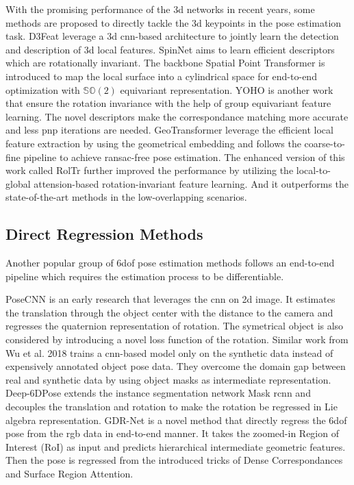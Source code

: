 \documentclass[12pt,DIV14,BCOR12mm,a4paper,footinclude=false,headinclude,parskip=half-,twoside,openright,cleardoublepage=empty,toc=index,bibliography=totoc,listof=totoc]{scrreprt}
\numberwithin{equation}{chapter}
\begin{document}
With the promising performance of the \gls{3d} networks \cite{qi2017pointnet,qi2017pointnet++} in recent years, some methods are proposed to directly tackle the \gls{3d} keypoints in the pose estimation task. D3Feat \cite{bai2020d3feat} leverage a \gls{3d} \gls{cnn}-based architecture to jointly learn the detection and description of \gls{3d} local features. SpinNet \cite{ao2021spinnet} aims to learn efficient descriptors which are rotationally invariant. The backbone Spatial Point Transformer is introduced to map the local surface into a cylindrical space for end-to-end optimization with $\mathbb{SO}(2)$ equivariant representation. YOHO \cite{wang2022hypothesize} is another work that ensure the rotation invariance with the help of group equivariant feature learning. The novel descriptors make the correspondance matching more accurate and less \gls{pnp} iterations are needed. GeoTransformer \cite{qin2022geometric} leverage the efficient local feature extraction by using the geometrical embedding and follows the coarse-to-fine pipeline to achieve \gls{ransac}-free pose estimation. The enhanced version of this work called RolTr \cite{yu2023rotationinvariant} further improved the performance by utilizing the local-to-global attension-based rotation-invariant feature learning. And it outperforms the state-of-the-art methods in the low-overlapping scenarios.


\subsection{Direct Regression Methods}
Another popular group of \gls{6dof} pose estimation methods follows an end-to-end pipeline which requires the estimation process to be differentiable.

PoseCNN\cite{xiang2018posecnn} is an early research that leverages the \gls{cnn} on \gls{2d} image. It estimates the translation through the object center with the distance to the camera and regresses the quaternion representation of rotation. The symetrical object is also considered by introducing a novel loss function of the rotation. Similar work from Wu et al. 2018 \cite{Wu_2018} trains a \gls{cnn}-based model only on the synthetic data instead of expensively annotated object pose data. They overcome the domain gap between real and synthetic data by using object masks as intermediate representation. Deep-6DPose \cite{do2018deep6dpose} extends the instance segmentation network Mask \gls{rcnn} \cite{he2018mask} and decouples the translation and rotation to make the rotation be regressed in Lie algebra representation. GDR-Net \cite{wang2021gdrnet} is a novel method that directly regress the \gls{6dof} pose from the \gls{rgb} data in end-to-end manner. It takes the zoomed-in Region of Interest (RoI) as input and predicts hierarchical intermediate geometric features. Then the pose is regressed from the introduced tricks of Dense Correspondances and Surface Region Attention.
\end{document}
